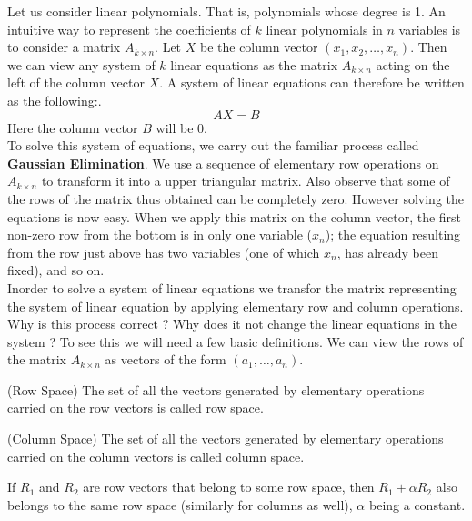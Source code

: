 Let us consider linear polynomials. That is, polynomials whose degree is 1. An intuitive way to represent the coefficients of $k$ linear polynomials in $n$ variables is to consider a matrix $A_{k \times n}$. Let $X$ be the column vector $(x_1, x_2, \ldots, x_n)$. Then we can view any 
system of $k$ linear equations as the matrix $A_{k \times n}$ acting on the left of the column vector $X$. A system of linear equations can therefore be written as the following:.\\
\[ AX = B \]
Here the column vector $B$ will be 0.\\
To solve this system of equations, we carry out the familiar process called \textbf{Gaussian Elimination}. We use a sequence of elementary row operations on $A_{k \times n}$ to transform it into a upper triangular matrix. Also observe that some of the rows of the matrix thus obtained can be completely zero. However solving the equations is now easy. When we apply this matrix on the column vector, the first non-zero row from the bottom is in only one variable ($x_n$); the equation resulting from the row just above has two variables (one of which $x_n$, has already been fixed), and so on.\\

Inorder to solve a system of linear equations we transfor the matrix representing the system of linear equation by applying elementary row and column operations. Why is this process correct ? Why does it not change the linear equations in the system ? To see this we will need a few basic definitions. We can view the rows of the matrix  $A_{k \times n}$ as vectors of the form $(a_1,\ldots,a_n)$. 

\begin{definition} (Row Space)
The set of all the vectors generated by elementary operations carried on the row vectors is called row space.
\end{definition}

\begin{definition} (Column Space)
The set of all the vectors generated by elementary operations carried on the column vectors is called column space.
\end{definition}

\begin{example}\label{row_space_example}
If $R_1$ and $R_2$ are row vectors that belong to some row space, then $R_1 + \alpha R_2$ also belongs to the same row space (similarly for columns as well), $\alpha$ being a constant.
\end{example}

